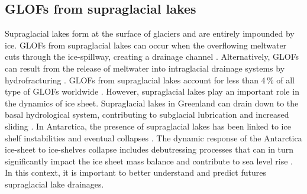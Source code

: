 

\subsection{GLOFs from supraglacial lakes}


Supraglacial lakes form at the surface of glaciers and are entirely impounded by ice. GLOFs from supraglacial lakes can occur when the overflowing meltwater cuts through the ice-spillway, creating a drainage channel \citep{Raymond&Nolan2000}. Alternatively, GLOFs can result from the release of meltwater into intraglacial drainage systems by hydrofracturing \citep[e.g.][]{Bjornsson1976, Boon&Sharp2003}. GLOFs from supraglacial lakes account for less than 4\,\% of all type of GLOFs worldwide \citep{Lutzow&al2023}. However, supraglacial lakes play an important role in the dynamics of ice sheet. Supraglacial lakes in Greenland \citep[e.g.][]{Mcmillan&al2007,Das&al2008} can drain down to the basal hydrological system, contributing to subglacial lubrication and increased sliding \citep[e.g.][]{Schoof2010,Pimentel&Flowers2011,Tedesco&al2013}. In Antarctica, the presence of supraglacial lakes has been linked to ice shelf instabilities and eventual collapses \citep[e.g.][]{Banwell&al2013,Banwell&al2019}. The dynamic response of the Antarctica ice-sheet to ice-shelves collapse includes debutressing processes that can in turn significantly impact the ice sheet mass balance and contribute to sea level rise \citep{Van&al2022}. In this context, it is important to better understand and predict futures supraglacial lake drainages. 

